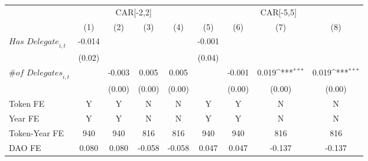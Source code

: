 {
\def\sym#1{\ifmmode^{#1}\else\(^{#1}\)\fi}
\begin{tabular}{l*{8}{c}}
\toprule
                    &\multicolumn{4}{c}{CAR[-2,2]}                                                          &\multicolumn{4}{c}{CAR[-5,5]}                                                          \\\cmidrule(lr){2-5}\cmidrule(lr){6-9}
                    &\multicolumn{1}{c}{(1)}         &\multicolumn{1}{c}{(2)}         &\multicolumn{1}{c}{(3)}         &\multicolumn{1}{c}{(4)}         &\multicolumn{1}{c}{(5)}         &\multicolumn{1}{c}{(6)}         &\multicolumn{1}{c}{(7)}         &\multicolumn{1}{c}{(8)}         \\
\midrule
$\textit{Has Delegate}_{i,t}$&      -0.014         &                     &                     &                     &      -0.001         &                     &                     &                     \\
                    &      (0.02)         &                     &                     &                     &      (0.04)         &                     &                     &                     \\
$\textit{\# of Delegates}_{i,t}$&                     &      -0.003         &       0.005         &       0.005         &                     &      -0.001         &       0.019\sym{***}&       0.019\sym{***}\\
                    &                     &      (0.00)         &      (0.00)         &      (0.00)         &                     &      (0.00)         &      (0.00)         &      (0.00)         \\
\midrule
Token FE            &           Y         &           Y         &           N         &           N         &           Y         &           Y         &           N         &           N         \\
Year FE             &           Y         &           Y         &           N         &           N         &           Y         &           Y         &           N         &           N         \\
Token-Year FE       &         940         &         940         &         816         &         816         &         940         &         940         &         816         &         816         \\
DAO FE              &       0.080         &       0.080         &      -0.058         &      -0.058         &       0.047         &       0.047         &      -0.137         &      -0.137         \\
\bottomrule
\end{tabular}
}
